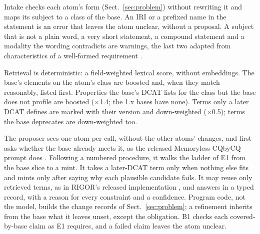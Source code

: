Intake checks each atom's form (Sect.~\ref{sec:problem}) without rewriting it and maps its subject to a class of %
the base. An \ac{IRI} or a prefixed name in the statement is an error that leaves the atom unclear, without a %
proposal. A subject that is not a plain word, a very short statement, a compound statement and a modality the %
wording contradicts are warnings, the last two adapted from characteristics of a well-formed requirement %
\cite{iso29148}.

Retrieval is deterministic: a field-weighted lexical score, without embeddings. The base's elements on the atom's %
class are boosted and, when they match reasonably, listed first. Properties the base's \acs{DCAT} lists for the %
class but the base does not profile are boosted ($\times$1.4; the 1.x bases have none). Terms only a later %
\acs{DCAT} defines are marked with their version and down-weighted ($\times$0.5); terms the base deprecates are %
down-weighted too. %

The proposer sees one atom per call, without the other atoms' changes, and first asks whether the base already %
meets it, as the released Memoryless CQbyCQ prompt does \cite{lippolis2025ontology}. Following a numbered %
procedure, it walks the ladder of E1 from the base slice to a mint. It takes a later-\acs{DCAT} term only when %
nothing else fits and mints only after saying why each plausible candidate fails. It may reuse only retrieved %
terms, as in RIGOR's released implementation \cite{fathallah2026rigor}, and answers in a typed record, with a
reason for every constraint and a confidence. Program code, not the model, builds the change records of %
Sect.~\ref{sec:problem}; a refinement inherits from the base what it leaves unset, except the
obligation. B1 checks each covered-by-base claim as E1 requires, and a failed claim leaves the atom unclear. %

